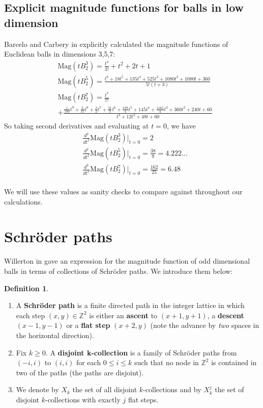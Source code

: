 \documentclass[11pt]{article}
\newcommand{\Z}{\mathbb{Z}}
\theoremstyle{definition}
\newtheorem{defn}{Definition}
\theoremstyle{definition}
\theoremstyle{plain}
\theoremstyle{plain}
\theoremstyle{plain}
\theoremstyle{definition}
\begin{document}
\subsection{Explicit magnitude functions for balls in low dimension}

Barcelo and Carbery in \cite{barcelo_magnitudes_2016} explicitly calculated the magnitude functions of Euclidean balls in dimensions 3,5,7:
\begin{align*}
&\text{Mag}(tB_2^3) = \frac{t^3}{3!}+t^2+2t+1 \\
&\text{Mag}(tB_2^5) = \frac{t^6+18t^5+135t^4+525t^3+1080t^2+1080t+360}{5!(t+3)} \\
&\text{Mag}(tB_2^7) = \frac{t^7}{7!} \\
&+ \frac{\frac{1}{180}t^9+\frac{2}{15}t^8+\frac{3}{2}t^7+\frac{31}{3}t^6+\frac{189}{4}t^5+145t^4+\frac{1165}{4}t^3+360t^2+240t+60}{t^3+12t^2+48t+60}
\end{align*}
So taking second derivatives and evaluating at $t = 0$, we have
\begin{align*}
&\frac{d^2}{dt^2}\text{Mag}(tB_2^3)\big\vert_{t=0} = 2 \\
&\frac{d^2}{dt^2}\text{Mag}(tB_2^5)\big\vert_{t=0} = \frac{38}{9} = 4.222\dots \\
&\frac{d^2}{dt^2}\text{Mag}(tB_2^7)\big\vert_{t=0} = \frac{162}{25} = 6.48 \\
\end{align*}

We will use these values as sanity checks to compare against throughout our calculations.

\section{Schröder paths}

Willerton in \cite{willerton_magnitude_2017} gave an expression for the magnitude function of odd dimensional balls in terms of collections of Schröder paths. We introduce them below:
\begin{defn}
\begin{enumerate}[label=$\bullet$]
\item A \textbf{Schröder path} is a finite directed path in the integer lattice in which each step $(x,y)\in\Z^2$ is either an \textbf{ascent} to $(x+1,y+1)$, a \textbf{descent} $(x-1,y-1)$ or a \textbf{flat step} $(x+2,y)$ (note the advance by \emph{two} spaces in the horizontal direction).
\item Fix $k\geq0$. A \textbf{disjoint k-collection} is a family of Schröder paths from $(-i,i)$ to $(i,i)$ for each $0\leq i\leq k$ such that no node in $\Z^2$ is contained in two of the paths (the paths are disjoint).
\item We denote by $X_k$ the set of all disjoint $k$-collections and by $X_k^j$ the set of disjoint $k$-collections with exactly $j$ flat steps.
\end{enumerate}
\end{defn}
\end{document}
